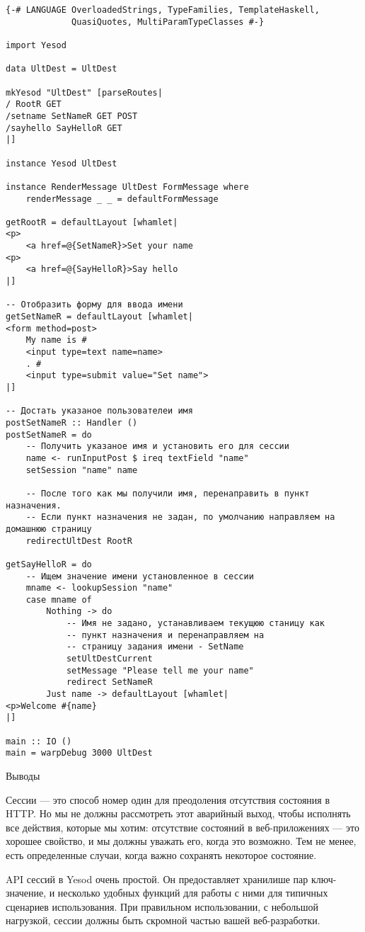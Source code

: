 \begin{lstlisting}
{-# LANGUAGE OverloadedStrings, TypeFamilies, TemplateHaskell,
             QuasiQuotes, MultiParamTypeClasses #-}

import Yesod

data UltDest = UltDest

mkYesod "UltDest" [parseRoutes|
/ RootR GET
/setname SetNameR GET POST
/sayhello SayHelloR GET
|]

instance Yesod UltDest

instance RenderMessage UltDest FormMessage where
    renderMessage _ _ = defaultFormMessage

getRootR = defaultLayout [whamlet|
<p>
    <a href=@{SetNameR}>Set your name
<p>
    <a href=@{SayHelloR}>Say hello
|]

-- Отобразить форму для ввода имени
getSetNameR = defaultLayout [whamlet|
<form method=post>
    My name is #
    <input type=text name=name>
    . #
    <input type=submit value="Set name">
|]

-- Достать указаное пользователеи имя
postSetNameR :: Handler ()
postSetNameR = do
    -- Получить указаное имя и установить его для сессии
    name <- runInputPost $ ireq textField "name"
    setSession "name" name

    -- После того как мы получили имя, перенаправить в пункт назначения.
    -- Если пункт назначения не задан, по умолчанию направляем на домашнюю страницу
    redirectUltDest RootR

getSayHelloR = do
    -- Ищем значение имени установленное в сессии
    mname <- lookupSession "name"
    case mname of
        Nothing -> do
            -- Имя не задано, устанавливаем текущюю станицу как
            -- пункт назначения и перенаправляем на
            -- страницу задания имени - SetName 
            setUltDestCurrent
            setMessage "Please tell me your name"
            redirect SetNameR
        Just name -> defaultLayout [whamlet|
<p>Welcome #{name}
|]

main :: IO ()
main = warpDebug 3000 UltDest
\end{lstlisting}

Выводы

Сессии --- это способ номер один для преодоления отсутствия состояния в HTTP. Но мы не должны рассмотреть этот аварийный выход, чтобы исполнять все действия, которые мы хотим: отсутствие состояний в веб-приложениях --- это хорошее свойство, и мы должны уважать его, когда это возможно. Тем не менее, есть определенные случаи, когда важно сохранять некоторое состояние. 

API сессий в Yesod очень простой. Он предоставляет хранилише пар ключ-значение, и несколько удобных функций для работы с ними для типичных сценариев использования. При правильном использовании, с небольшой нагрузкой, сессии должны быть скромной частью вашей веб-разработки. 
